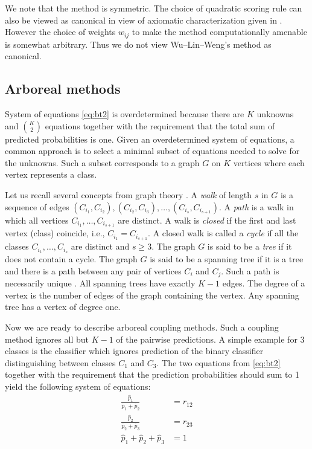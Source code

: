 \documentclass[pdflatex, sn-basic]{sn-jnl}%
\theoremstyle{thmstyleone}%
\theoremstyle{thmstyletwo}%
\theoremstyle{thmstylethree}%
\begin{document}
We note that the method is symmetric. The choice of quadratic scoring rule can also be viewed as canonical in view of axiomatic characterization given in  \cite{selten1998axiomatic}.  However the choice of weights $w_{ij}$ to make the method computationally amenable is somewhat arbitrary. Thus we do not view Wu--Lin--Weng's method as canonical.

\subsection{Arboreal methods}

System of equations \eqref{eq:bt2} is overdetermined because there are $K$ unknowns and $\binom{K}{2}$ equations together with the requirement that the total sum of predicted probabilities is one. 
Given an overdetermined system of equations, a common approach is to select a minimal subset of equations needed to solve for the unknowns. 
Such a subset corresponds to a graph $G$ on $K$ vertices where each vertex represents a class.  

Let us recall several concepts from graph theory \cite{harary1969graph}. 
A \emph{walk} of length $s$ in $G$ is a sequence of edges 
$(C_{i_1}, C_{i_2}), (C_{i_2}, C_{i_3}), \ldots,  (C_{i_{s}}, C_{i_{s+1}})$. 
A \emph{path} is a walk in which all vertices $C_{i_1}, \ldots, C_{i_{s+1}}$ are distinct.
A walk is \emph{closed} if the first and last vertex (class) coincide, i.e., $C_{i_1} = C_{i_{s+1}}$. 
A closed walk is called a \emph{cycle} if all the classes
$C_{i_1}, \ldots, C_{i_s}$ are distinct and $s\geq 3$. 
The graph $G$ is said to be a \emph{tree} if it does not contain a cycle.
The graph $G$ is said to be a spanning tree if it is a tree and  there is a path between any pair of vertices $C_i$ and $C_j$. Such a path is necessarily unique \cite[Theorem 4.1]{harary1969graph}. 
All spanning trees have exactly $K-1$ edges. The degree of a vertex is the number of edges of the graph 
containing the vertex. Any spanning tree has a vertex of degree one.

Now we are ready to describe  arboreal coupling methods. Such a coupling method ignores all but $K-1$ of the pairwise predictions. A simple example for 3 classes is the classifier which ignores prediction of the binary classifier distinguishing between classes $C_1$ and $C_3$. The two equations from \eqref{eq:bt2} together with the requirement that the prediction probabilities should sum to 1 yield the following system of equations:
\begin{equation}
	\begin{split}
		\frac{\hat p_1}{\hat p_1 + \hat p_2} &= {r}_{12}\\
		\frac{\hat p_2}{\hat p_2 + \hat p_3} &= {r}_{23}\\
		\hat p_1 + \hat p_2 + \hat p_3 &= 1
	\end{split}
	\label{eq:arb1}
\end{equation}
\end{document}
